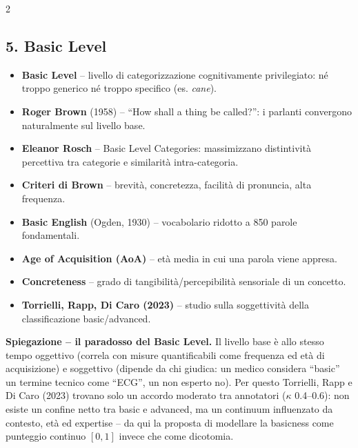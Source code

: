 \documentclass[10pt,a4paper]{extarticle}
\begin{document}
\begin{multicols}{2}
\subsection*{5. Basic Level}
\begin{itemize}
\item \textbf{Basic Level} -- livello di categorizzazione cognitivamente privilegiato: n\'e troppo generico n\'e troppo specifico (es. \emph{cane}).
\item \textbf{Roger Brown} (1958) -- ``How shall a thing be called?'': i parlanti convergono naturalmente sul livello base.
\item \textbf{Eleanor Rosch} -- Basic Level Categories: massimizzano distintivit\`a percettiva tra categorie e similarit\`a intra-categoria.
\item \textbf{Criteri di Brown} -- brevit\`a, concretezza, facilit\`a di pronuncia, alta frequenza.
\item \textbf{Basic English} (Ogden, 1930) -- vocabolario ridotto a 850 parole fondamentali.
\item \textbf{Age of Acquisition (AoA)} -- et\`a media in cui una parola viene appresa.
\item \textbf{Concreteness} -- grado di tangibilit\`a/percepibilit\`a sensoriale di un concetto.
\item \textbf{Torrielli, Rapp, Di Caro (2023)} -- studio sulla soggettivit\`a della classificazione basic/advanced.
\end{itemize}
\smallskip\noindent\textbf{\textcolor{blue!45!black}{Spiegazione -- il paradosso del Basic Level.}} Il livello base \`e allo stesso tempo oggettivo (correla con misure quantificabili come frequenza ed et\`a di acquisizione) e soggettivo (dipende da chi giudica: un medico considera ``basic'' un termine tecnico come ``ECG'', un non esperto no). Per questo Torrielli, Rapp e Di Caro (2023) trovano solo un accordo moderato tra annotatori ($\kappa$ 0.4--0.6): non esiste un confine netto tra basic e advanced, ma un continuum influenzato da contesto, et\`a ed expertise -- da qui la proposta di modellare la basicness come punteggio continuo $[0,1]$ invece che come dicotomia.


\end{multicols}
\end{document}
